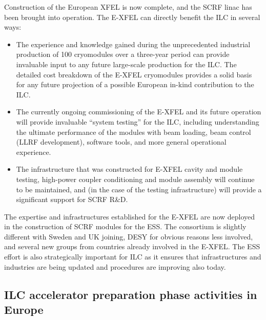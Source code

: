 \documentclass[%
 reprint,
 floatfix,
 amsmath,amssymb,
 aps,
]{revtex4-1}
\begin{document}
Construction of the European XFEL is now complete, and the SCRF linac has been brought into operation. The E-XFEL can directly benefit the ILC in several ways: 
\begin{itemize}
\item The experience and knowledge gained during the unprecedented industrial
production of 100 cryomodules over a three-year period can provide 
invaluable input to any future large-scale production for the ILC. The detailed cost breakdown of the E-XFEL cryomodules 
provides a solid basis for any future projection of a possible European in-kind contribution to the ILC. 
\item 
The currently ongoing commissioning of the E-XFEL and its future operation will provide invaluable ``system testing'' for the ILC, 
including understanding the ultimate performance of the modules with beam loading, beam control (LLRF development), software tools, 
and more general operational experience. 
\item The infrastructure that was constructed for E-XFEL cavity and module 
testing, high-power coupler conditioning and module assembly will continue to be maintained, and (in the case of the testing infrastructure) will provide a significant support for SCRF R\&D.
\end{itemize}

The expertise and infrastructures established for the E-XFEL are now deployed in the construction of SCRF modules for the ESS. 
The consortium is slightly different with Sweden and UK joining, DESY for obvious reasons less involved, and several new groups from countries already 
involved in the E-XFEL. The ESS effort is also strategically important for ILC as it ensures that infrastructures and industries 
are being updated and procedures are improving also today.

\subsection{ILC accelerator preparation phase activities in Europe ~\label{sec:acc:prephase}}
\end{document}
